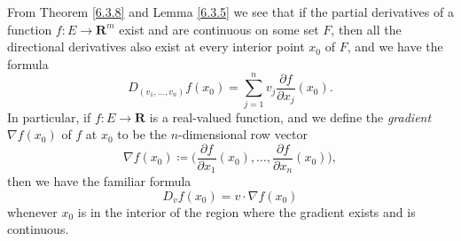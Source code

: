 \begin{additional corollary}\label{ac 6.3.3}
From Theorem \ref{6.3.8} and Lemma \ref{6.3.5} we see that if the partial derivatives of a function \(f : E \to \mathbf{R}^m\) exist and are continuous on some set \(F\), then all the directional derivatives also exist at every interior point \(x_0\) of \(F\), and we have the formula
\[
    D_{(v_1, \dots, v_n)} f(x_0) = \sum_{j = 1}^n v_j \frac{\partial f}{\partial x_j}(x_0).
\]
In particular, if \(f : E \to \mathbf{R}\) is a real-valued function, and we define the \emph{gradient} \(\nabla f(x_0)\) of \(f\) at \(x_0\) to be the \(n\)-dimensional row vector
\[
    \nabla f(x_0) \coloneqq \bigg(\frac{\partial f}{\partial x_1}(x_0), \dots, \frac{\partial f}{\partial x_n}(x_0)\bigg),
\]
then we have the familiar formula
\[
    D_v f(x_0) = v \cdot \nabla f(x_0)
\]
whenever \(x_0\) is in the interior of the region where the gradient exists and is continuous.
\end{additional corollary}

